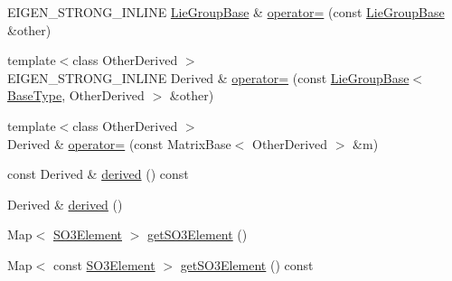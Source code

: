\begin{DoxyCompactItemize}
\item 
E\+I\+G\+E\+N\+\_\+\+S\+T\+R\+O\+N\+G\+\_\+\+I\+N\+L\+I\+NE \hyperlink{class_lie_group_base}{Lie\+Group\+Base} \& \hyperlink{class_lie_group_base_3_01_array_3_01typename_01internal_1_1traits_3_01_derived_01_4_1_1_scalar_0d6d4b5459662fc32c7117aee50362fb1_a8e98c7beac9a53cdc9b456057e01952d}{operator=} (const \hyperlink{class_lie_group_base}{Lie\+Group\+Base} \&other)
\item 
{\footnotesize template$<$class Other\+Derived $>$ }\\E\+I\+G\+E\+N\+\_\+\+S\+T\+R\+O\+N\+G\+\_\+\+I\+N\+L\+I\+NE Derived \& \hyperlink{class_lie_group_base_3_01_array_3_01typename_01internal_1_1traits_3_01_derived_01_4_1_1_scalar_0d6d4b5459662fc32c7117aee50362fb1_a693084dd5df8a0d00793be750608fb36}{operator=} (const \hyperlink{class_lie_group_base}{Lie\+Group\+Base}$<$ \hyperlink{class_lie_group_base_3_01_array_3_01typename_01internal_1_1traits_3_01_derived_01_4_1_1_scalar_0d6d4b5459662fc32c7117aee50362fb1_aadee14149cfa071338ac1f64e23c283d}{Base\+Type}, Other\+Derived $>$ \&other)
\item 
{\footnotesize template$<$class Other\+Derived $>$ }\\Derived \& \hyperlink{class_lie_group_base_3_01_array_3_01typename_01internal_1_1traits_3_01_derived_01_4_1_1_scalar_0d6d4b5459662fc32c7117aee50362fb1_a11405917134c914ec2971dae31075886}{operator=} (const Matrix\+Base$<$ Other\+Derived $>$ \&m)
\item 
const Derived \& \hyperlink{class_lie_group_base_3_01_array_3_01typename_01internal_1_1traits_3_01_derived_01_4_1_1_scalar_0d6d4b5459662fc32c7117aee50362fb1_adc2e7eb1827c5354dfa2c6abcd3f919b}{derived} () const
\item 
Derived \& \hyperlink{class_lie_group_base_3_01_array_3_01typename_01internal_1_1traits_3_01_derived_01_4_1_1_scalar_0d6d4b5459662fc32c7117aee50362fb1_ad790b10c4804ee6a98cd87bdd1c8c61d}{derived} ()
\item 
Map$<$ \hyperlink{class_lie_group_base_3_01_array_3_01typename_01internal_1_1traits_3_01_derived_01_4_1_1_scalar_0d6d4b5459662fc32c7117aee50362fb1_a2594349e8f4329af620dff380a457890}{S\+O3\+Element} $>$ \hyperlink{class_lie_group_base_3_01_array_3_01typename_01internal_1_1traits_3_01_derived_01_4_1_1_scalar_0d6d4b5459662fc32c7117aee50362fb1_a2517b91d8ec4da8c307fa428d839000b}{get\+S\+O3\+Element} ()
\item 
Map$<$ const \hyperlink{class_lie_group_base_3_01_array_3_01typename_01internal_1_1traits_3_01_derived_01_4_1_1_scalar_0d6d4b5459662fc32c7117aee50362fb1_a2594349e8f4329af620dff380a457890}{S\+O3\+Element} $>$ \hyperlink{class_lie_group_base_3_01_array_3_01typename_01internal_1_1traits_3_01_derived_01_4_1_1_scalar_0d6d4b5459662fc32c7117aee50362fb1_afb657a659f0ab1ef96925dd9f371ca0b}{get\+S\+O3\+Element} () const

\end{DoxyCompactItemize}
